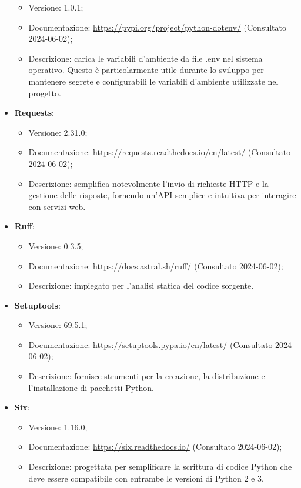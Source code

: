 \begin{itemize}
\begin{itemize}
        \item Versione: 1.0.1;
        \item Documentazione: \url{https://pypi.org/project/python-dotenv/} (Consultato 2024-06-02);
        \item Descrizione: carica le variabili d'ambiente da file .env nel sistema operativo. Questo è particolarmente utile durante lo sviluppo per mantenere segrete e configurabili le variabili d'ambiente utilizzate nel progetto.
    \end{itemize}
    \item \textbf{Requests}:
    \begin{itemize}
        \item Versione: 2.31.0;
        \item Documentazione: \url{https://requests.readthedocs.io/en/latest/} (Consultato 2024-06-02);
        \item Descrizione: semplifica notevolmente l'invio di richieste HTTP e la gestione delle risposte, fornendo un'API semplice e intuitiva per interagire con servizi web.
    \end{itemize}
    \item \textbf{Ruff}:
    \begin{itemize}
        \item Versione: 0.3.5;
        \item Documentazione: \url{https://docs.astral.sh/ruff/} (Consultato 2024-06-02);
        \item Descrizione: impiegato per l'analisi statica del codice sorgente.
    \end{itemize}
    \item \textbf{Setuptools}:
    \begin{itemize}
        \item Versione: 69.5.1;
        \item Documentazione: \url{https://setuptools.pypa.io/en/latest/} (Consultato 2024-06-02);
        \item Descrizione: fornisce strumenti per la creazione, la distribuzione e l'installazione di pacchetti Python.
    \end{itemize}
    \item \textbf{Six}:
    \begin{itemize}
        \item Versione: 1.16.0;
        \item Documentazione: \url{https://six.readthedocs.io/} (Consultato 2024-06-02);
        \item Descrizione: progettata per semplificare la scrittura di codice Python che deve essere compatibile con entrambe le versioni di Python 2 e 3.

\end{itemize}
\end{itemize}
